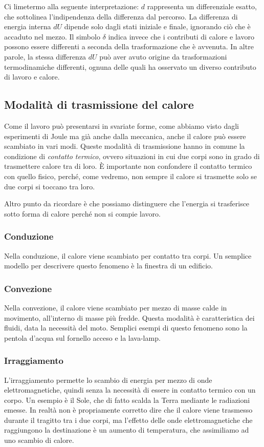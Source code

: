 \noindent Ci limetermo alla seguente interpretazione: $d$ rappresenta
un differenziale esatto, che sottolinea l'indipendenza della differenza
dal percorso. La differenza di energia interna $dU$ dipende solo dagli
stati iniziale e finale, ignorando ciò che è accaduto nel mezzo.
Il simbolo $\delta$ indica invece che i contributi di calore e lavoro
possono essere differenti a seconda della trasformazione che è
avvenuta. In altre parole, la stessa differenza $dU$ può aver
avuto origine da trasformazioni termodinamiche differenti, ognuna
delle quali ha osservato un diverso contributo di lavoro e calore.

\subsection{Modalità di trasmissione del calore}
Come il lavoro può presentarsi in svariate forme, come abbiamo
visto dagli esperimenti di Joule ma già anche dalla meccanica,
anche il calore può essere scambiato in vari modi. Queste modalità
di trasmissione hanno in comune la condizione di \textit{contatto
termico}, ovvero situazioni in cui due corpi sono in grado di
trasmettere calore tra di loro. È importante non confondere il
contatto termico con quello fisico, perché, come vedremo, non
sempre il calore si trasmette solo se due corpi si toccano tra loro.

Altro punto da ricordare è che possiamo distinguere che l'energia
si trasferisce sotto forma di calore perché non si compie lavoro.

\subsubsection{Conduzione}
Nella conduzione, il calore viene scambiato per contatto tra corpi.
Un semplice modello per descrivere questo fenomeno è la finestra di
un edificio.

\subsubsection{Convezione}
Nella convezione, il calore viene scambiato per mezzo di masse calde
in movimento, all'interno di masse più fredde. Questa modalità è
caratteristica dei fluidi, data la necessità del moto. Semplici esempi
di questo fenomeno sono la pentola d'acqua sul fornello acceso e la
lava-lamp.

\subsubsection{Irraggiamento}
L'irraggiamento permette lo scambio di energia per mezzo di onde
elettromagnetiche, quindi senza la necessità di essere in contatto
termico con un corpo. Un esempio è il Sole, che di fatto scalda la
Terra mediante le radiazioni emesse. In realtà non è propriamente
corretto dire che il calore viene trasmesso durante il tragitto tra
i due corpi, ma l'effetto delle onde elettromagnetiche che raggiungono
la destinazione è un aumento di temperatura, che assimiliamo ad uno
scambio di calore.

